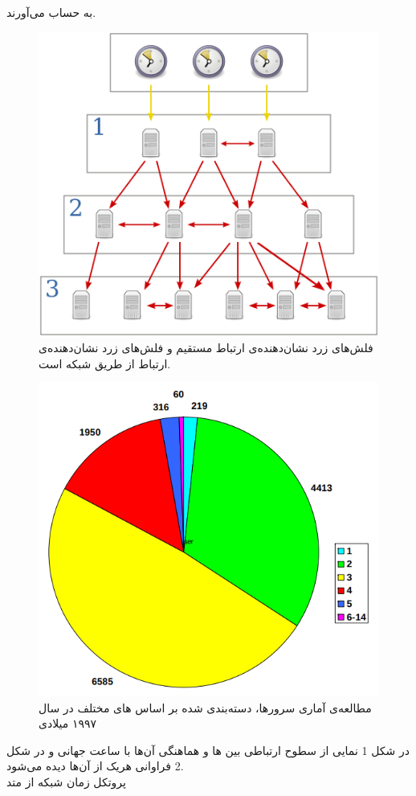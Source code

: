 \documentclass{article}
\begin{document}
\begin{multicols}{2}
به حساب می‌آورند.
\begin{figure}[H]
    \centering
    \includegraphics[width=0.7\linewidth]{Photos/HW2/levels.png}
    \caption{فلش‌های زرد نشان‌دهنده‌ی ارتباط مستقیم و فلش‌های زرد نشان‌دهنده‌ی ارتباط از طریق شبکه است.}
    \label{fig:my_label}
\end{figure}
\begin{figure}[H]
    \centering
    \includegraphics[width=0.85\linewidth]{Photos/HW2/stratum.png}
    \caption{مطالعه‌ی آماری سرورها، دسته‌بندی شده بر اساس
    های مختلف در سال ۱۹۹۷ میلادی}
    \label{fig:my_label}
\end{figure}
در شکل 1 نمایی از سطوح ارتباطی بین
ها و هماهنگی آن‌ها با ساعت جهانی و در شکل 2 فراوانی هریک از آن‌ها دیده می‌شود.\\
پروتکل زمان شبکه از متد

\end{multicols}
\end{document}

